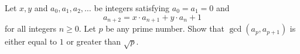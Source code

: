 Let $x,y$ and $a_0,a_1,a_2,\dots$ be integers satisfying $a_0 = a_1 = 0$ and
$$a_{n+2} = x\cdot a_{n+1} + y\cdot a_n + 1$$
for all integers $n\geq 0$.
Let $p$ be any prime number.
Show that $\gcd(a_p,a_{p+1})$ is either equal to $1$ or greater than $\sqrt{p}$.
